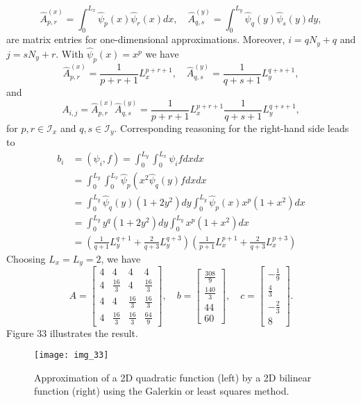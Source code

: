 \documentclass[../main.tex]{subfiles}
\begin{document}
	$$
	\hat{A}_{p, r}^{(x)}=\int_{0}^{L_{x}} \hat{\psi}_{p}(x) \hat{\psi}_{r}(x) d x, \quad \hat{A}_{q, s}^{(y)}=\int_{0}^{L_{y}} \hat{\psi}_{q}(y) \hat{\psi}_{s}(y) d y,
	$$
	are matrix entries for one-dimensional approximations. Moreover, $i=q N_{y}+q$ and $j=s N_{y}+r$.
	With $\hat{\psi}_{p}(x)=x^{p}$ we have
	$$
	\hat{A}_{p, r}^{(x)}=\frac{1}{p+r+1} L_{x}^{p+r+1}, \quad \hat{A}_{q, s}^{(y)}=\frac{1}{q+s+1} L_{y}^{q+s+1},
	$$
	and
	$$
	A_{i, j}=\hat{A}_{p, r}^{(x)} \hat{A}_{q, s}^{(y)}=\frac{1}{p+r+1} L_{x}^{p+r+1} \frac{1}{q+s+1} L_{y}^{q+s+1},
	$$
	for $p, r \in \mathcal{I}_{x}$ and $q, s \in \mathcal{I}_{y}$.
	Corresponding reasoning for the right-hand side leads to
	$$
	\begin{aligned}
		b_{i} &=\left(\psi_{i}, f\right)=\int_{0}^{L_{y}} \int_{0}^{L_{x}} \psi_{i} f d x d x \\
		&=\int_{0}^{L_{y}} \int_{0}^{L_{x}} \hat{\psi}_{p}\left(x^{2} \hat{\psi}_{q}(y) f d x d x\right.\\
		&=\int_{0}^{L_{y}} \hat{\psi}_{q}(y)\left(1+2 y^{2}\right) d y \int_{0}^{L_{y}} \hat{\psi}_{p}(x) x^{p}\left(1+x^{2}\right) d x \\
		&=\int_{0}^{L_{y}} y^{q}\left(1+2 y^{2}\right) d y \int_{0}^{L_{y}} x^{p}\left(1+x^{2}\right) d x \\
		&=\left(\frac{1}{q+1} L_{y}^{q+1}+\frac{2}{q+3} L_{y}^{q+3}\right)\left(\frac{1}{p+1} L_{x}^{p+1}+\frac{2}{q+3} L_{x}^{p+3}\right)
	\end{aligned}
	$$
	Choosing $L_{x}=L_{y}=2$, we have
	$$
	A=\left[\begin{array}{cccc}
		4 & 4 & 4 & 4 \\
		4 & \frac{16}{3} & 4 & \frac{16}{3} \\
		4 & 4 & \frac{16}{3} & \frac{16}{3} \\
		4 & \frac{16}{3} & \frac{16}{3} & \frac{64}{9}
	\end{array}\right], \quad b=\left[\begin{array}{c}
		\frac{308}{9} \\
		\frac{140}{3} \\
		44 \\
		60
	\end{array}\right], \quad c=\left[\begin{array}{r}
		-\frac{1}{9} \\
		\frac{4}{3} \\
		-\frac{2}{3} \\
		8
	\end{array}\right] .
	$$
	Figure 33 illustrates the result.
	\begin{figure}[H]
		\centering
		\texttt{[image: img\_33]}
		\caption{Approximation of a 2D quadratic function (left) by a 2D bilinear
			function (right) using the Galerkin or least squares method.}
		\label{fig:img_33}
	\end{figure}
	
\end{document}

